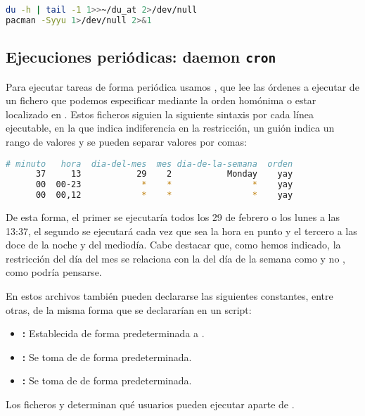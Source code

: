 \begin{lstlisting}[language=Bash]
du -h | tail -1 1>>~/du_at 2>/dev/null
pacman -Syyu 1>/dev/null 2>&1
\end{lstlisting}

\subsection{Ejecuciones periódicas: daemon \texttt{cron}}

Para ejecutar tareas de forma periódica usamos , que lee las órdenes a ejecutar de un fichero  que podemos especificar mediante la orden homónima o estar localizado en .
Estos ficheros siguien la siguiente sintaxis por cada línea ejecutable, en la que \code{*} indica indiferencia en la restricción, un guión indica un rango de valores y se pueden separar valores por comas:

\begin{lstlisting}[language=Bash]
# minuto   hora  dia-del-mes  mes dia-de-la-semana  orden
      37     13           29    2           Monday    yay
      00  00-23            *    *                *    yay
      00  00,12            *    *                *    yay
\end{lstlisting}

De esta forma, el primer  se ejecutaría todos los 29 de febrero o los lunes a las 13:37, el segundo se ejecutará cada vez que sea la hora en punto y el tercero a las doce de la noche y del mediodía.
Cabe destacar que, como hemos indicado, la restricción del día del mes se relaciona con la del día de la semana como  y no , como podría pensarse.

En estos archivos también pueden declararse las siguientes constantes, entre otras, de la misma forma que se declararían en un script:

\begin{itemize}
	\item{}\textbf{:} Establecida de forma predeterminada a .
	\item{}\textbf{:} Se toma de  de forma predeterminada.
	\item{}\textbf{:} Se toma de  de forma predeterminada.
\end{itemize}

Los ficheros  y  determinan qué usuarios pueden ejecutar  aparte de .

